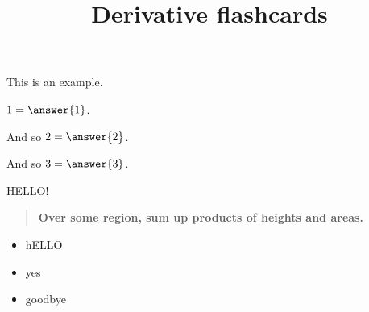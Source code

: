 \documentclass{ximera}
\title{Derivative flashcards}
\begin{document}
\begin{example}
  This is an example.

  $1 = \answer{1}$.
  
  \begin{problem}
    And so $2 = \answer{2}$.
  \end{problem}

  \begin{problem}
    And so $3 = \answer{3}$.
  \end{problem}
  
  \begin{hint}
    HELLO!
  \end{hint}  
\end{example}

\begin{quote}
\textbf{Over \textcolor{red!50!black}{some region},
\textcolor{green!70!black!70!blue}{sum up} products of
\textcolor{purple!50!blue!90!black}{heights} and \textcolor{blue!70!green}{areas}.}
\end{quote}


\begin{itemize}
\item hELLO
\item yes
\item goodbye
\end{itemize}
\end{document}
